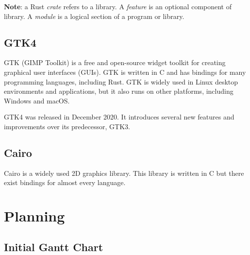 \documentclass[a4paper]{article}
\begin{document}
\textbf{\color{red} Note}: a \gls{Rust} \textit{crate} refers to a library.
A \textit{feature} is an optional component of library.
A \textit{module} is a logical section of a program or library.

\subsection{GTK4}

\gls{GTK} (GIMP Toolkit) is a free and open-source widget toolkit for
creating graphical user interfaces (\gls{GUI}s).
\gls{GTK} is written in \gls{C} and has bindings for many programming languages,
including Rust.
\gls{GTK} is widely used in Linux desktop environments and applications,
but it also runs on other platforms, including Windows and macOS.

\gls{GTK}4 was released in December 2020.
It introduces several new features and improvements over its predecessor,
\gls{GTK}3.

\subsection{Cairo}

Cairo\cite{cairo} is a widely used 2D graphics library.
This library is written in C but there exist bindings for almost every language.

\pagebreak

\section{Planning}

\subsection{Initial Gantt Chart}
\end{document}
